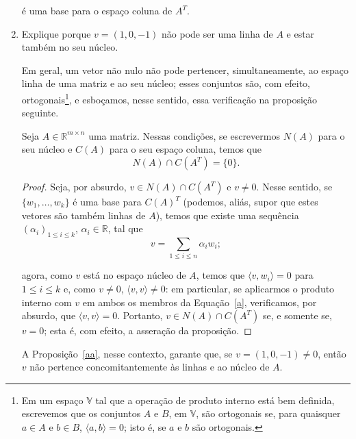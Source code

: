 \documentclass[leqno]{article}
\begin{document}
\begin{enumerate}
\begin{sol}
	\noindent é uma base para o espaço coluna de $A^{T}$. 
\end{sol} 

\item Explique porque $v = (1, 0, -1)$ não pode ser uma linha de $A$ e estar também no seu núcleo.

\begin{sol} 
	Em geral, um vetor não nulo não pode pertencer, simultaneamente, ao espaço linha de uma matriz e ao seu núcleo; esses conjuntos são, com efeito, ortogonais\footnote{Em um espaço $\mathbb{V}$ tal que a operação de produto interno está bem definida, escrevemos que os conjuntos $A$ e $B$, em $\mathbb{V}$, são ortogonais se, para quaisquer $a \in A$ e $b \in B$, $\langle a, b \rangle = 0$; isto é, se $a$ e $b$ são ortogonais.}, e esboçamos, nesse sentido, essa verificação na proposição seguinte. 

	\begin{prop} \label{aa}  
		Seja $A \in \mathbb{R}^{m \times n}$ uma matriz. Nessas condições, se escrevermos $N(A)$ para o seu núcleo e $C(A)$ para o seu espaço coluna, temos que 
		\begin{equation*} 
			N(A) \cap C(A^{T}) = \{0\}.    
		\end{equation*} 
	\end{prop} 
	\begin{proof} 
		Seja, por absurdo, $v \in N(A) \cap C(A^{T})$ e $v \neq 0$. Nesse sentido, se $\{w_{1}, \dots, w_{k}\}$ é uma base para $C(A)^{T}$ (podemos, aliás, supor que estes vetores são também linhas de $A$), temos que existe uma sequência $(\alpha_{i})_{1 \le i \le k}$, $\alpha_{i} \in \mathbb{R}$, tal que 
		\begin{equation} \label{a}  
			v = \sum_{1 \le i \le n} \alpha_{i} w_{i};  
		\end{equation} 
		
		\noindent agora, como $v$ está no espaço núcleo de $A$, temos que $\langle v, w_{i} \rangle = 0$ para $1 \le i \le k$ e, como $v \neq 0$, $\langle v, v \rangle \neq 0$: em particular, se aplicarmos o produto interno com $v$ em ambos os membros da Equação~\eqref{a}, verificamos, por absurdo, que $\langle v, v \rangle = 0$. Portanto, $v \in N(A) \cap C(A^{T})$ se, e somente se, $v = 0$; esta é, com efeito, a asseração da proposição. 
	\end{proof} 

	\noindent A Proposição~\ref{aa}, nesse contexto, garante que, se $v = (1, 0, -1) \neq 0$, então $v$ não pertence concomitantemente às linhas e ao núcleo de $A$.  
\end{sol} 


\end{enumerate}
\end{document}
